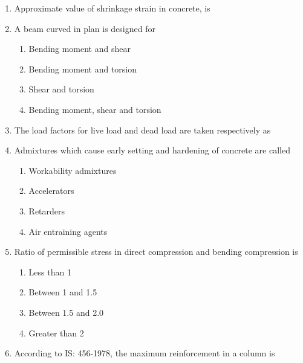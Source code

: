 \documentclass[11pt,a4paper]{article}
\begin{document}
\begin{enumerate}
\item{Approximate value of shrinkage strain in concrete, is}
\\
\item{A beam curved in plan is designed for}
\begin{enumerate}[label=\Alph*.]
\item{Bending moment and shear}
\item{Bending moment and torsion}
\item{Shear and torsion}
\item{Bending moment, shear and torsion}
\end{enumerate}
\item{The load factors for live load and dead load are taken respectively as}
\\
\item{Admixtures which cause early setting and hardening of concrete are called}
\begin{enumerate}[label=\Alph*.]
\item{Workability admixtures}
\item{Accelerators}
\item{Retarders}
\item{Air entraining agents}
\end{enumerate}
\item{Ratio of permissible stress in direct compression and bending compression is}
\begin{enumerate}[label=\Alph*.]
\item{Less than 1}
\item{Between 1 and 1.5}
\item{Between 1.5 and 2.0}
\item{Greater than 2}
\end{enumerate}
\item{According to IS: 456-1978, the maximum reinforcement in a column is}

\end{enumerate}
\end{document}
